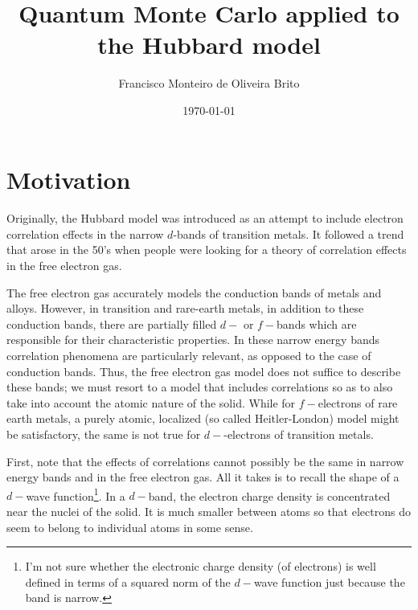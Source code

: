 \documentclass[10pt]{article}
\begin{document}
\title{Quantum Monte Carlo applied to the Hubbard model}
\author{Francisco Monteiro de Oliveira Brito}
\date{\today}
\maketitle

\begin{abstract}

\end{abstract}

\section{Motivation}\paragraph{}

Originally, the Hubbard model was introduced as an attempt to include electron correlation effects in the narrow $d$-bands of transition metals. It followed a trend that arose in the 50's when people were looking for a theory of correlation effects in the free electron gas.

The free electron gas accurately models the conduction bands of metals and alloys. However, in transition and rare-earth metals, in addition to these conduction bands, there are partially filled $d-$ or $f-$bands which are responsible for their characteristic properties. In these narrow energy bands  correlation phenomena are particularly relevant, as opposed to the case of conduction bands. Thus, the free electron gas model does not suffice to describe these bands; we must resort to a model that includes correlations so as to also take into account the atomic nature of the solid. While for $f-$electrons of rare earth metals, a purely atomic, localized (so called Heitler-London) model might be satisfactory, the same is not true for $d-$-electrons of transition metals.

First, note that the effects of correlations cannot possibly be the same in narrow energy bands and in the free electron gas. All it takes is to recall the shape of a $d-$wave function\footnote{I'm not sure whether the electronic charge density (of electrons) is well defined in terms of a squared norm of the $d-$wave function just because the band is narrow.}. In a $d-$band, the electron charge density is concentrated near the nuclei of the solid. It is much smaller between atoms so that electrons do seem to belong to individual atoms in some sense.
\end{document}
